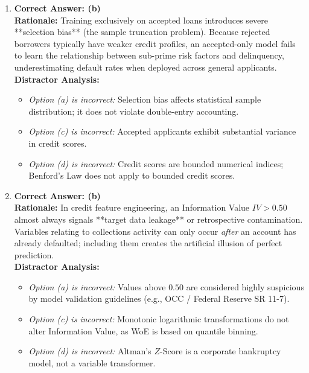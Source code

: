 \begin{enumerate}[label=\textbf{MCQ 8.\arabic*}]
    \item \textbf{Correct Answer: (b)}\\
    \textbf{Rationale:} Training exclusively on accepted loans introduces severe **selection bias** (the sample truncation problem). Because rejected borrowers typically have weaker credit profiles, an accepted-only model fails to learn the relationship between sub-prime risk factors and delinquency, underestimating default rates when deployed across general applicants.\\
    \textbf{Distractor Analysis:}
    \begin{itemize}
        \item \textit{Option (a) is incorrect:} Selection bias affects statistical sample distribution; it does not violate double-entry accounting.
        \item \textit{Option (c) is incorrect:} Accepted applicants exhibit substantial variance in credit scores.
        \item \textit{Option (d) is incorrect:} Credit scores are bounded numerical indices; Benford's Law does not apply to bounded credit scores.
    \end{itemize}

    \item \textbf{Correct Answer: (b)}\\
    \textbf{Rationale:} In credit feature engineering, an Information Value $IV > 0.50$ almost always signals **target data leakage** or retrospective contamination. Variables relating to collections activity can only occur \textit{after} an account has already defaulted; including them creates the artificial illusion of perfect prediction.\\
    \textbf{Distractor Analysis:}
    \begin{itemize}
        \item \textit{Option (a) is incorrect:} Values above $0.50$ are considered highly suspicious by model validation guidelines (e.g., OCC / Federal Reserve SR 11-7).
        \item \textit{Option (c) is incorrect:} Monotonic logarithmic transformations do not alter Information Value, as WoE is based on quantile binning.
        \item \textit{Option (d) is incorrect:} Altman's $Z$-Score is a corporate bankruptcy model, not a variable transformer.
    \end{itemize}
\end{enumerate}

